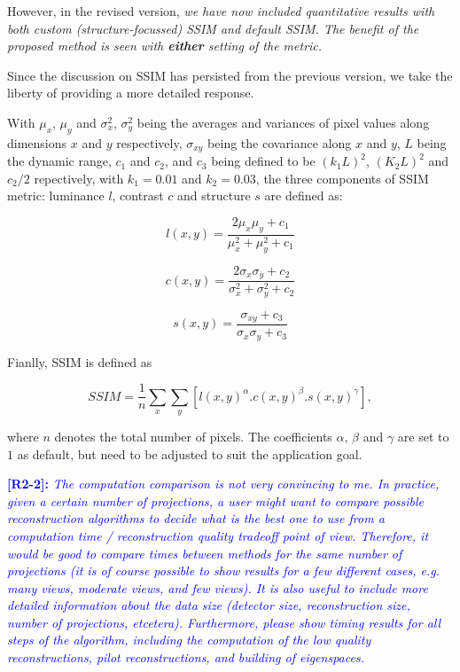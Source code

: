 \documentclass[11pt]{article}
\begin{document}
\begin{enumerate}
    However, in the revised version, \emph{we have now included quantitative
    results with both custom (structure-focussed) SSIM and default
    SSIM. The benefit of the proposed method is seen with
    \textbf{either} setting of the metric.}

    Since the discussion on SSIM has persisted from the previous
    version, we take the liberty of providing a more detailed
    response. %

    With $\mu_x$, $\mu_y$ and $\sigma_x^2$, $\sigma_y^2$ being the
    averages and variances of pixel values along dimensions $x$ and
    $y$ respectively, $\sigma_{xy}$ being the covariance along $x$ and
    $y$, $L$ being the dynamic range, $c_1$ and $c_2$, and $c_3$ being
    defined to be $(k_1L)^2$, $(K_2L)^2$ and $c_2/2$ repectively, with
    $k_1=0.01$ and $k_2=0.03$, the three components of SSIM metric:
    luminance $l$, contrast $c$ and structure $s$ are defined as:

\begin{equation}
l(x,y) = \frac{2\mu_x\mu_y + c_1}{\mu_x^2 + \mu_y^2 + c_1}
\end{equation}

\begin{equation}
  c(x,y) = \frac{2\sigma_x\sigma_y + c_2}{\sigma_x^2 + \sigma_y^2 + c_2}
\end{equation}

\begin{equation}
  s(x,y) = \frac{\sigma_{xy} + c_3}{\sigma_x\sigma_y + c_3}
\end{equation}

Fianlly, SSIM is defined as

\begin{equation}
  SSIM = \frac{1}{n}\sum_x\sum_y [l(x,y)^\alpha. c(x,y)^\beta. s(x,y)^\gamma],
\end{equation}

where $n$ denotes the total number of pixels. The coefficients
$\alpha$, $\beta$ and $\gamma$ are set to $1$ as default, but need to
be adjusted to suit the application goal.
\end{enumerate}

\vspace{0.5cm}\textcolor{blue}{\textbf{[R2-2]:} \textit{The computation comparison is
    not very convincing to me. In practice, given a certain number of
    projections, a user might want to compare possible reconstruction
    algorithms to decide what is the best one to use from a
    computation time / reconstruction quality tradeoff point of
    view. Therefore, it would be good to compare times between methods
    for the same number of projections (it is of course possible to
    show results for a few different cases, e.g. many views, moderate
    views, and few views). It is also useful to include more detailed
    information about the data size (detector size, reconstruction
    size, number of projections, etcetera). Furthermore, please show
    timing results for all steps of the algorithm, including the
    computation of the low quality reconstructions, pilot
    reconstructions, and building of eigenspaces.}} 
\end{document}
